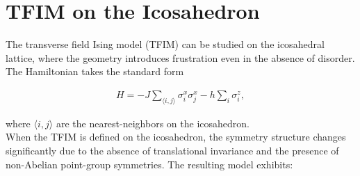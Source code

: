\documentclass{article}
\begin{document}
\section{TFIM on the Icosahedron}

The transverse field Ising model (TFIM) can be studied on the icosahedral lattice, where the geometry introduces frustration even in the absence of disorder. The Hamiltonian takes the standard form

\begin{align}
H = -J \sum_{\langle i, j \rangle} \sigma_i^x \sigma_j^x - h \sum_i \sigma_i^z,
\end{align}

where $\langle i, j \rangle$ are the nearest-neighbors on the icosahedron.\\

When the TFIM is defined on the icosahedron, the symmetry structure changes significantly due to the absence of translational invariance and the presence of non-Abelian point-group symmetries. The resulting model exhibits:
\end{document}
